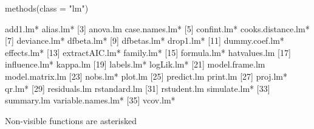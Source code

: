 \begin{Schunk}
\begin{Sinput}
 methods(class = "lm")
\end{Sinput}
\begin{Soutput}
 [1] add1.lm*           alias.lm*         
 [3] anova.lm           case.names.lm*    
 [5] confint.lm*        cooks.distance.lm*
 [7] deviance.lm*       dfbeta.lm*        
 [9] dfbetas.lm*        drop1.lm*         
[11] dummy.coef.lm*     effects.lm*       
[13] extractAIC.lm*     family.lm*        
[15] formula.lm*        hatvalues.lm      
[17] influence.lm*      kappa.lm          
[19] labels.lm*         logLik.lm*        
[21] model.frame.lm     model.matrix.lm   
[23] nobs.lm*           plot.lm           
[25] predict.lm         print.lm          
[27] proj.lm*           qr.lm*            
[29] residuals.lm       rstandard.lm      
[31] rstudent.lm        simulate.lm*      
[33] summary.lm         variable.names.lm*
[35] vcov.lm*          

   Non-visible functions are asterisked
\end{Soutput}
\end{Schunk}
